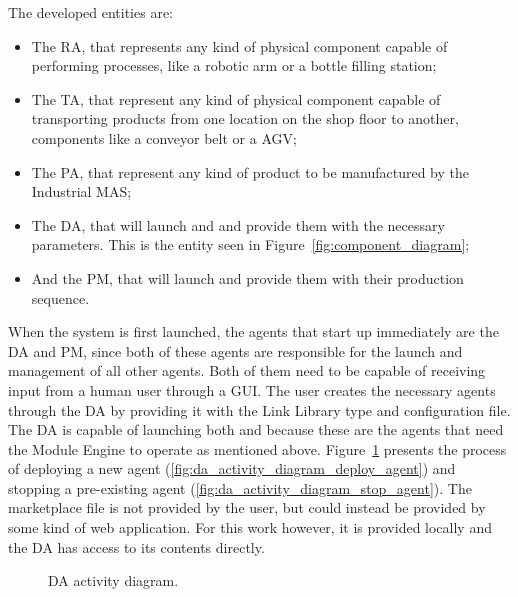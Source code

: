 The developed entities are:
\begin{itemize}
	\item The \acrfull{RA}, that represents any kind of physical component capable of performing processes, like a robotic arm or a bottle filling station;
	\item The \acrfull{TA}, that represent any kind of physical component capable of transporting products from one location on the shop floor to another, components like a conveyor belt or a \acrfull{AGV};
	\item The \acrfull{PA}, that represent any kind of product to be manufactured by the Industrial \acrshort{MAS};
	\item The \acrfull{DA}, that will launch  and  and provide them with the necessary parameters. This is the entity seen in Figure~\ref{fig:component_diagram};
	\item And the \acrfull{PM}, that will launch  and provide them with their production sequence.
\end{itemize}


When the system is first launched, the agents that start up immediately are the \acrfull{DA} and \acrfull{PM}, since both of these agents are responsible for the launch and management of all other agents. Both of them need to be capable of receiving input from a human user through a \acrfull{GUI}. The user creates the necessary agents through the \acrshort{DA} by providing it with the Link Library type and configuration file. The \acrshort{DA} is capable of launching both  and  because these are the agents that need the Module Engine to operate as mentioned above. Figure~\ref{fig:da_activity_diagrams} presents the process of deploying a new agent (\ref{fig:da_activity_diagram_deploy_agent}) and stopping a pre-existing agent (\ref{fig:da_activity_diagram_stop_agent}). The marketplace file is not provided by the user, but could instead be provided by some kind of web application. For this work however, it is provided locally and the \acrshort{DA} has access to its contents directly.\\

\begin{figure}[h!]
	\centering
	\hspace{0.80cm}
	\caption{\acrlong{DA} activity diagram.}
	\label{fig:da_activity_diagrams}
\end{figure}


